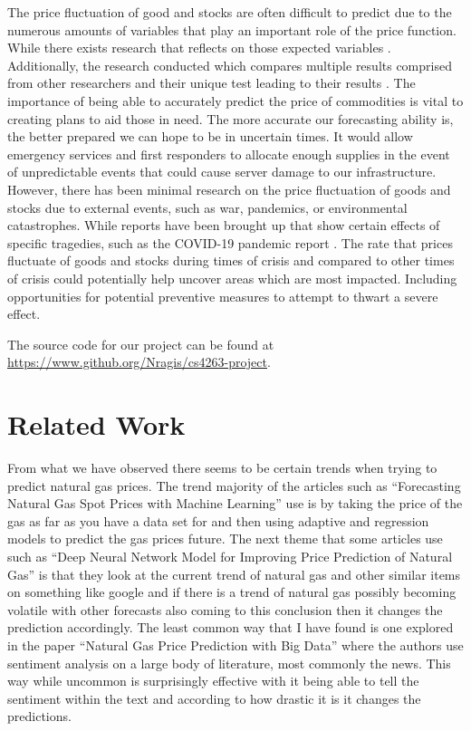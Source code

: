 \documentclass[final]{cvpr}
\begin{document}
The price fluctuation of good and stocks are often difficult to predict due to
the numerous amounts of variables that play an important role of the price
function. While there exists research that reflects on those expected variables
\cite{romero}. Additionally, the research conducted which compares multiple results
comprised from other researchers and their unique test leading to their results
\cite{srivastava}.  The importance of being able to accurately predict the price of
commodities is vital to creating plans to aid those in need. The more accurate
our forecasting ability is, the better prepared we can hope to be in uncertain
times. It would allow emergency services and first responders to allocate enough
supplies in the event of unpredictable events that could cause server damage to
our infrastructure.  However, there has been minimal research on the price
fluctuation of goods and stocks due to external events, such as war, pandemics,
or environmental catastrophes. While reports have been brought up that show
certain effects of specific tragedies, such as the COVID-19 pandemic report
\cite{mead}. The rate that prices fluctuate of goods and stocks during times of
crisis and compared to other times of crisis could potentially help uncover
areas which are most impacted. Including opportunities for potential preventive
measures to attempt to thwart a severe effect.

The source code for our project can be found at 
\url{https://www.github.org/Nragis/cs4263-project}.

\section{Related Work}

From what we have observed there seems to be certain trends when trying to
predict natural gas prices. The trend majority of the articles such as
“Forecasting Natural Gas Spot Prices with Machine Learning” use is by taking
the price of the gas as far as you have a data set for and then using
adaptive and regression models to predict the gas prices future. The next
theme that some articles use such as “Deep Neural Network Model for
Improving Price Prediction of Natural Gas” is that they look at the current
trend of natural gas and other similar items on something like google and if
there is a trend of natural gas possibly becoming volatile with other
forecasts also coming to this conclusion then it changes the prediction
accordingly. The least common way that I have found is one explored in the
paper “Natural Gas Price Prediction with Big Data” where the authors use
sentiment analysis on a large body of literature, most commonly the news.
This way while uncommon is surprisingly effective with it being able to tell
the sentiment within the text and according to how drastic it is it changes
the predictions.
\end{document}
